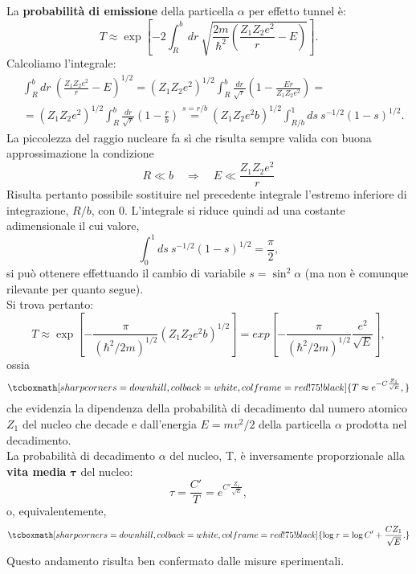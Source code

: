 La \textbf{probabilità di emissione} della particella $\alpha$ per effetto tunnel è:
	\begin{equation}
		T \approx \exp \left[ -2 \int _R ^b dr\ \sqrt{\frac{2m}{\hbar ^2}\left(\frac{Z_1 Z_2 e^2}{r}-E\right)}\right].
	\end{equation}
Calcoliamo l'integrale:
	\begin{align}
		&\displaystyle{\int _R ^b dr\ \left(\frac{Z_1 Z_2 e^2}{r}-E\right)^{1/2}=\left(Z_1 Z_2 e^2\right)^{1/2}\int _R ^b \frac{dr}{\sqrt{r}}\left(1-\frac{Er}{Z_1 Z_2 e^2}\right)=}\nonumber \\
		&\displaystyle{=\left(Z_1 Z_2 e^2\right)^{1/2}\int _R ^b \frac{dr}{\sqrt{r}}\left(1-\frac{r}{b}\right)\overset{s=r/b}{=}}\displaystyle{\left(Z_1 Z_2 e^2 b\right)^{1/2}\int _{R/b} ^1 ds\ s^{-1/2} (1-s)^{1/2}}.
	\end{align}
La piccolezza del raggio nucleare fa sì che risulta sempre valida con buona approssimazione la condizione
	\begin{equation}
		R\ll b \quad \Rightarrow \quad E \ll \frac{Z_1 Z_2 e^2}{r}
	\end{equation}
Risulta pertanto possibile sostituire nel precedente integrale l'estremo inferiore di integrazione, $R/b$, con $0$. L'integrale si riduce quindi ad una costante adimensionale il cui valore,
	\begin{equation}
		\int _{0} ^1 ds\ s^{-1/2} (1-s)^{1/2}= \frac{\pi}{2},
	\end{equation}
si può ottenere effettuando il cambio di variabile $s= \sin^2 \alpha$ (ma non è comunque rilevante per quanto segue).\\
Si trova pertanto:
	\begin{equation}
		T\approx  \exp \left[ -\frac{\pi}{(\hbar ^2 /2m)^{1/2}}\left(Z_1 Z_2 e^2 b\right)^{1/2}\right]=  exp \left[ -\frac{\pi}{(\hbar ^2 /2m)^{1/2}}\frac{e^2}{\sqrt{E}}\right],
	\end{equation}
ossia
	\begin{equation}
		\tcboxmath[sharp corners=downhill, colback=white, colframe=red!75!black]{
			T \approx e^{-C\frac{Z_1}{\sqrt{E}}},
			}
	\end{equation}
che evidenzia la dipendenza della probabilità di decadimento dal numero atomico $Z_1$ del nucleo che decade e dall'energia $E=mv^2/2$ della particella $\alpha$ prodotta nel decadimento.\\

La probabilità di decadimento $\alpha$ del nucleo, T, è inversamente proporzionale alla \textbf{vita media} $\mathbf{\tau}$ del nucleo:
	\begin{equation}
		\tau=\frac{C'}{T}=e^{C'\frac{Z_1}{\sqrt{E}}},
	\end{equation}
o, equivalentemente,
	\begin{equation}
		\tcboxmath[sharp corners=downhill, colback=white, colframe=red!75!black]{
			\log \tau = \log C' + \frac{C Z_1}{\sqrt{E}}.
			}
	\end{equation}
Questo andamento risulta ben confermato dalle misure sperimentali.
